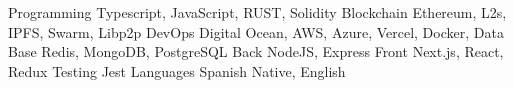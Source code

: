 


\begin{cvskills}

\cvskill
{Programming} %
{Typescript, JavaScript, RUST, Solidity} %
\cvskill
{Blockchain} %
{Ethereum, L2s, IPFS, Swarm, Libp2p} %
\cvskill
{DevOps} %
{Digital Ocean, AWS, Azure, Vercel, Docker, } %
\cvskill
{Data Base} %
{Redis, MongoDB, PostgreSQL} %
\cvskill
{Back} %
{NodeJS, Express} %
\cvskill
{Front} %
{Next.js, React, Redux} %
\cvskill
{Testing} %
{Jest} %
\cvskill
{Languages} %
{Spanish Native, English} %
\end{cvskills}
